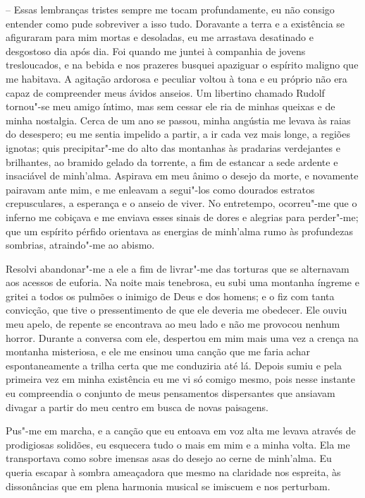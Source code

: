 -- Essas lembranças tristes sempre me tocam profundamente, eu não consigo
entender como pude sobreviver a isso tudo. Doravante a terra e a
existência se afiguraram para mim mortas e desoladas, eu me arrastava
desatinado e desgostoso dia após dia. Foi quando me juntei à companhia
de jovens tresloucados, e na bebida e nos prazeres busquei apaziguar o
espírito maligno que me habitava. A agitação ardorosa e peculiar voltou
à tona e eu próprio não era capaz de compreender meus ávidos anseios.
Um libertino chamado Rudolf tornou"-se meu amigo íntimo, mas sem cessar
ele ria de minhas queixas e de minha nostalgia. Cerca de um ano se
passou, minha angústia me levava às raias do desespero; eu me sentia
impelido a partir, a ir cada vez mais longe, a regiões ignotas; quis
precipitar"-me do alto das montanhas às pradarias verdejantes e
brilhantes, ao bramido gelado da torrente, a fim de \mbox{estancar} a sede
ardente e insaciável de minh'alma. Aspirava em meu ânimo o desejo da
morte, e novamente pairavam ante mim, e me enleavam a segui"-los como
dourados estratos crepusculares, a esperança e o anseio de viver. No
entretempo, ocorreu"-me que o inferno me cobiçava e me enviava esses
sinais de dores e alegrias para perder"-me; que um espírito pérfido
orientava as energias de minh'alma rumo às profundezas sombrias,
atraindo"-me ao abismo.

Resolvi abandonar"-me a ele a fim de livrar"-me das torturas que
se alternavam aos acessos de euforia. Na noite mais tenebrosa, eu subi uma
montanha íngreme e gritei a todos os pulmões o inimigo de Deus e dos
homens; e o fiz com tanta convicção, que tive o pressentimento de que
ele deveria me obedecer. Ele ouviu meu apelo, de repente se encontrava
ao meu lado e não me provocou nenhum horror. Durante a conversa com
ele, despertou em mim mais uma vez a crença na montanha misteriosa, e
ele me ensinou uma canção que me faria achar espontaneamente a trilha
certa que me conduziria até lá. Depois sumiu e pela primeira vez em
minha existência eu me vi só comigo mesmo, pois nesse instante eu
compreendia o conjunto de meus pensamentos dispersantes que ansiavam
divagar a partir do meu centro em busca de novas paisagens.

Pus"-me em marcha, e a canção que eu entoava em voz alta me levava
através de prodigiosas solidões, eu esquecera tudo o mais em mim e 
a minha volta. Ela me transportava como sobre imensas asas do desejo ao cerne
de minh'alma. Eu queria escapar à sombra ameaçadora que mesmo na
claridade nos espreita, às \mbox{dissonâncias} que em plena harmonia
musical se imiscuem e nos perturbam.

